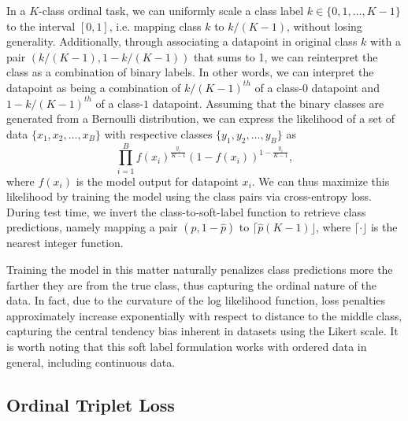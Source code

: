 In a $K$-class ordinal task, we can uniformly scale a class label $k \in \{0, 1, \dots, K-1\}$ to the interval $\left[0, 1\right]$, i.e. mapping class $k$ to $k/(K-1)$, without losing generality. Additionally, through associating a datapoint in original class $k$ with a pair $(k/(K-1), 1-k/(K-1))$ that sums to 1, we can reinterpret the class as a combination of binary labels. In other words, we can interpret the datapoint as being a combination of $k/(K-1)^{th}$ of a class-$0$ datapoint and $1-k/(K-1)^{th}$ of a class-$1$ datapoint.
Assuming that the binary classes are generated from a Bernoulli distribution, %
we can express the likelihood of a set of data $\{x_1, x_2, \dots, x_B\}$ with respective classes $\{y_1, y_2, \dots, y_B\}$ as
$$\prod_{i=1}^B f(x_i)^{\frac{y_i}{K-1}}(1-f(x_i))^{1-\frac{y_i}{K-1}},$$
where $f(x_i)$ is the model output for datapoint $x_i$. We can thus maximize this likelihood by training the model using the class pairs via cross-entropy loss. During test time, we invert the class-to-soft-label function to retrieve class predictions, namely mapping a pair $(\hat{p}, 1-\hat{p})$ to $\lceil \hat{p}(K-1) \rfloor$, where $\lceil\cdot\rfloor$ is the nearest integer function.

Training the model in this matter naturally penalizes class predictions more the farther they are from the true class, thus capturing the ordinal nature of the data.
In fact, due to the curvature of the log likelihood function, loss penalties approximately increase exponentially with respect to distance to the middle class, capturing the central tendency bias inherent in datasets using the Likert scale. %
It is worth noting that this soft label formulation works with ordered data in general, including continuous data.

\subsection{Ordinal Triplet Loss}

